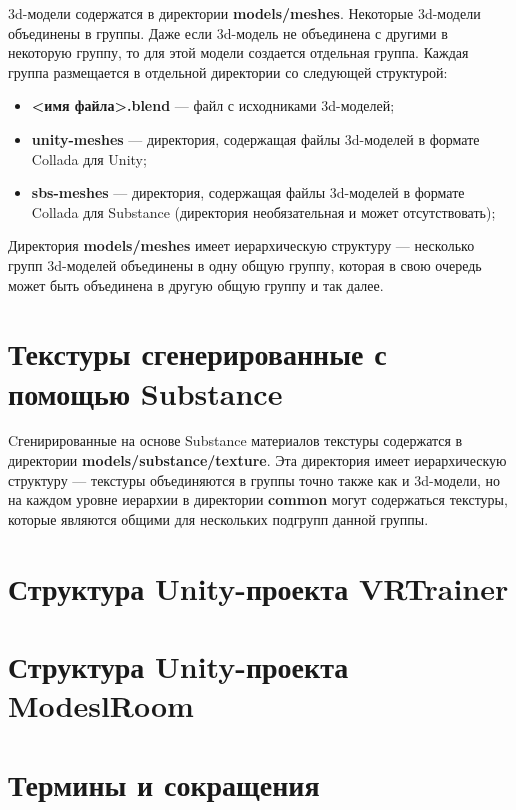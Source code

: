 3d-модели содержатся в директории \textbf{models/meshes}. Некоторые 3d-модели объединены в группы. Даже если 3d-модель не объединена с другими в некоторую группу, то для этой модели создается отдельная группа. Каждая группа размещается в отдельной директории со следующей структурой: 


\begin{itemize}
	\item \textbf{<имя файла>.blend} --- файл с исходниками 3d-моделей;
	\item \textbf{unity-meshes} --- директория, содержащая файлы 3d-моделей в формате Collada для Unity;
	\item \textbf{sbs-meshes} --- директория, содержащая файлы 3d-моделей в формате Collada для Substance (директория необязательная и может отсутствовать);
\end{itemize}

Директория \textbf{models/meshes} имеет иерархическую структуру --- несколько групп 3d-моделей объединены в одну общую группу, которая в свою очередь может быть объединена в другую общую группу и так далее. 


\section{Текстуры сгенерированные с помощью Substance}

Cгенирированные на основе Substance материалов текстуры содержатся в директории \textbf{models/substance/texture}. Эта директория имеет иерархическую структуру --- текстуры объединяются в группы точно также как и 3d-модели, но на каждом уровне иерархии в директории \textbf{common} могут содержаться текстуры, которые являются общими для нескольких подгрупп данной группы.


\section{Структура Unity-проекта VRTrainer}

\section{Структура Unity-проекта ModeslRoom}

\section{Термины и сокращения}






